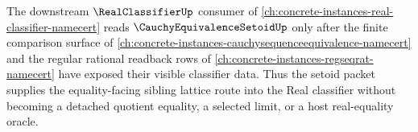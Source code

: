 The downstream $\RealClassifierUp$ consumer of \autoref{ch:concrete-instances-real-classifier-namecert} reads $\CauchyEquivalenceSetoidUp$ only after the finite comparison surface of \autoref{ch:concrete-instances-cauchysequenceequivalence-namecert} and the regular rational readback rows of \autoref{ch:concrete-instances-regseqrat-namecert} have exposed their visible classifier data. Thus the setoid packet supplies the equality-facing sibling lattice route into the Real classifier without becoming a detached quotient equality, a selected limit, or a host real-equality oracle.
